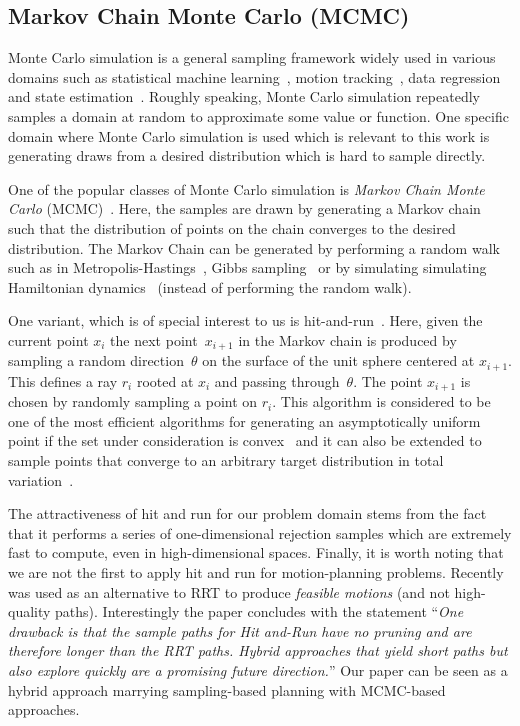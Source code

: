 \documentclass[letterpaper, 10 pt, conference]{ieeeconf}  %
\begin{document}
\subsection{Markov Chain Monte Carlo (MCMC)}
\label{subsec:mcmc}
Monte Carlo simulation is a general sampling framework widely used in various domains such as
statistical machine learning~\cite{M97},
motion tracking~\cite{KBD04}, 
data regression~\cite{TL11} and 
state estimation~\cite{ASC13}.
Roughly speaking, Monte Carlo simulation repeatedly samples a domain at random to approximate some value or function.
One specific domain where Monte Carlo simulation is used which is relevant to this work is generating draws from a desired distribution which is hard to sample directly.

One of the popular classes of Monte Carlo simulation is 
\emph{Markov Chain Monte Carlo} (MCMC)~\cite{ADDJ03}.
Here, the samples are drawn by generating a Markov chain such that the distribution of points on the chain converges to the desired distribution.
The Markov Chain can be generated by performing a random walk such as
in Metropolis-Hastings~\cite{CG95}, 
Gibbs sampling~\cite{CK94}
or by simulating simulating Hamiltonian dynamics~\cite{N94} (instead of performing the random walk).

One variant, which is of special interest to us is 
hit-and-run~\cite{S84,KSZ11}.
Here, given the current point $x_i$ the next point~$x_{i+1}$ in the Markov chain is produced by sampling a random direction~$\theta$ on the surface of the unit sphere centered at $x_{i+1}$. This defines a ray $r_i$ rooted at $x_i$ and passing through~$\theta$. The point $x_{i+1}$ is chosen by randomly sampling a point on $r_i$.
This algorithm is considered to be one of the most efficient algorithms for generating an asymptotically uniform point if the set under consideration is convex~\cite{L99, LV06}
and it can also be extended to sample points that converge to an arbitrary target distribution in total variation~\cite{BRS93, RS94}.

The attractiveness of hit and run for our problem domain stems from the fact that it performs a series of one-dimensional rejection samples which are extremely fast to compute, even in high-dimensional spaces. 
Finally, it is worth noting that we are not the first to apply hit and run for motion-planning problems.
Recently~\cite{YPVA17} was used as an alternative to RRT to produce \emph{feasible motions} (and not high-quality paths). 
Interestingly the paper concludes with the statement ``\emph{One drawback is that the sample paths for Hit and-Run have no pruning and are therefore longer than the RRT paths. Hybrid approaches that yield short paths but also explore quickly are a promising future direction.}''
Our paper can be seen as a hybrid approach marrying sampling-based planning with MCMC-based approaches.
\end{document}

